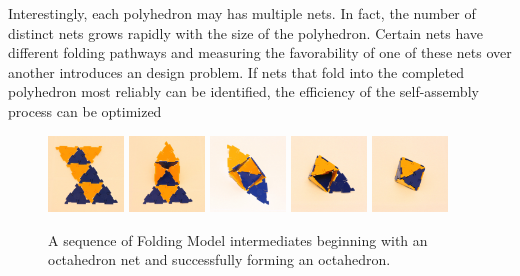 Interestingly, each polyhedron may has multiple nets. In fact, the number of distinct nets grows rapidly with the size of the polyhedron. Certain nets have different folding pathways and measuring the favorability of one of these nets over another introduces an design problem. If nets that fold into the completed polyhedron most reliably can be identified, the efficiency of the self-assembly process can be optimized~\cite{Pandey2011, Pandey2014}

\begin{figure}[h]

       \centering
                \includegraphics[width=0.18\textwidth]{images/folds_0.eps}
                \includegraphics[width=0.18\textwidth]{images/folds_1.eps}
                \includegraphics[width=0.18\textwidth]{images/folds_2.eps}
                \includegraphics[width=0.18\textwidth]{images/folds_3A.eps}
                \includegraphics[width=0.18\textwidth]{images/folds_4A.eps}

\caption{A sequence of Folding Model intermediates beginning with an octahedron net and successfully forming an octahedron.}
\label{fig:fold_octa}
\end{figure}

